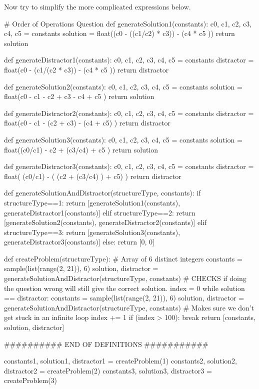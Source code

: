 \documentclass{ximera}
\begin{document}
Now try to simplify the more complicated expressions below.

\begin{sagesilent}
# Order of Operations Question
def generateSolution1(constants):
    c0, c1, c2, c3, c4, c5 = constants
    solution = float((c0 - ((c1/c2) * c3)) - (c4 * c5 ))
    return solution

def generateDistractor1(constants):
    c0, c1, c2, c3, c4, c5 = constants
    distractor = float(c0 - (c1/(c2 * c3)) - (c4 * c5 ))
    return distractor

def generateSolution2(constants):
    c0, c1, c2, c3, c4, c5 = constants
    solution = float(c0 - c1 - c2 + c3 - c4 + c5 )
    return solution

def generateDistractor2(constants):
    c0, c1, c2, c3, c4, c5 = constants
    distractor = float(c0 - c1 - (c2 + c3) - (c4 + c5) )
    return distractor

def generateSolution3(constants):
    c0, c1, c2, c3, c4, c5 = constants
    solution = float((c0/c1) - c2 + (c3/c4) + c5 )
    return solution

def generateDistractor3(constants):
    c0, c1, c2, c3, c4, c5 = constants
    distractor = float( (c0/c1) - ( (c2 + (c3/c4) ) + c5) )
    return distractor

def generateSolutionAndDistractor(structureType, constants):
    if structureType==1:
        return [generateSolution1(constants), generateDistractor1(constants)]
    elif structureType==2:
        return [generateSolution2(constants), generateDistractor2(constants)]
    elif structureType==3:
        return [generateSolution3(constants), generateDistractor3(constants)]
    else:
        return [0, 0]

def createProblem(structureType):
    # Array of 6 distinct integers
    constants = sample(list(range(2, 21)), 6)
    solution, distractor = generateSolutionAndDistractor(structureType, constants)
    # CHECKS if doing the question wrong will still give the correct solution.
    index = 0
    while solution == distractor:
        constants = sample(list(range(2, 21)), 6)
        solution, distractor = generateSolutionAndDistractor(structureType, constants)
        # Makes sure we don't get stuck in an infinite loop
        index += 1
        if (index > 100):
            break
    return [constants, solution, distractor]

########## END OF DEFINITIONS ###########

constants1, solution1, distractor1 = createProblem(1)
constants2, solution2, distractor2 = createProblem(2)
constants3, solution3, distractor3 = createProblem(3)

\end{sagesilent}
\end{document}
